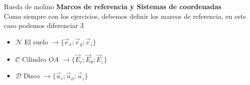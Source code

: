\begin{solucion}{Rueda de molino}
\textbf{Marcos de referencia y Sistemas de coordenadas}\\
Como siempre con los ejercicios, debemos definir los marcos de referencia, en este caso podemos diferenciar 3
\begin{itemize}
    \item $\mathcal{N}$ El suelo $\longrightarrow\{\vec{e}_x;\vec{e}_y;\vec{e}_z\}$
    \item $\mathcal{C}$ Cilindro $OA$ $\longrightarrow\{\vec{E}_r;\vec{E}_\theta;\vec{E}_z\}$
    \item $\mathcal{D}$ Disco $\longrightarrow\{\vec{u}_r;\vec{u}_\phi;\vec{u}_z\}$
\end{itemize}


\end{solucion}
